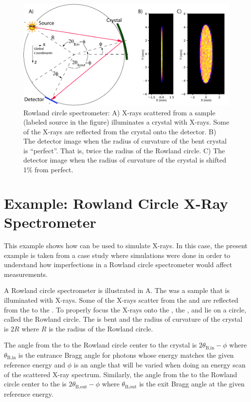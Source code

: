 \begin{figure}[tb]
  \centering
  \includegraphics[width=5in]{rowland-circle.pdf}
  \caption[Rowland circle spectrometer]
  {
Rowland circle spectrometer: A) X-rays scattered from a sample (labeled source in the figure)
illuminates a crystal with X-rays. Some of the X-rays are reflected from the crystal onto the
detector. B) The detector image when the radius of curvature of the bent crystal is
``perfect''. That is, twice the radius of the Rowland circle. C) The detector image when the radius
of curvature of the crystal is shifted 1\% from perfect.
  }
  \label{f:rowland}
\end{figure}

\section{Example: Rowland Circle X-Ray Spectrometer}
\label{s:rowland}

This example shows how \bmad can be used to simulate X-rays. In this case, the present example is
taken from a case study where simulations were done in order to understand how imperfections in a Rowland
circle spectrometer would affect measurements.

A Rowland circle spectrometer is illustrated in A. The  was
a sample that is illuminated with X-rays. Some of the X-rays scatter from the  and are
reflected from the  to the . To properly focus the X-rays onto the
, the ,  and  lie on a circle, called the Rowland
circle. The  is bent and the radius of curvature of the crystal is
$2R$ where $R$ is the radius of the Rowland circle.

The angle from the  to the Rowland circle center to the crystal is
$2\theta_\text{B,in}-\phi$ where $\theta_\text{B,in}$ is the entrance Bragg angle for photons whose
energy matches the given reference energy and $\phi$ is an angle that will be varied when doing an energy
scan of the scattered X-ray spectrum. Similarly, the angle from the  to the Rowland
circle center to the  is $2\theta_\text{B,out}-\phi$ where $\theta_\text{B,out}$ is the
exit Bragg angle at the given reference energy.

